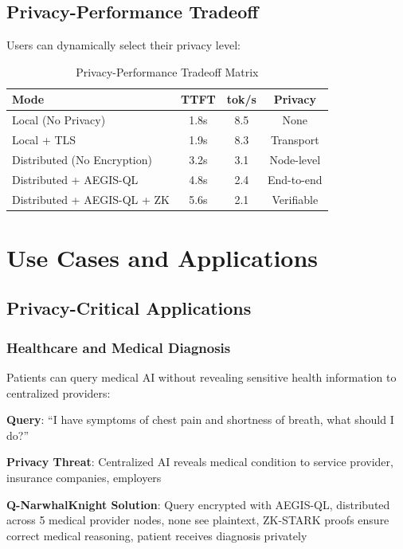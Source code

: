 \documentclass[11pt,a4paper]{article}
\begin{document}
\subsection{Privacy-Performance Tradeoff}

Users can dynamically select their privacy level:

\begin{table}[H]
\centering
\caption{Privacy-Performance Tradeoff Matrix}
\begin{tabular}{|l|c|c|c|}
\hline
\textbf{Mode} & \textbf{TTFT} & \textbf{tok/s} & \textbf{Privacy} \\
\hline
Local (No Privacy) & 1.8s & 8.5 & None \\
Local + TLS & 1.9s & 8.3 & Transport \\
Distributed (No Encryption) & 3.2s & 3.1 & Node-level \\
Distributed + AEGIS-QL & 4.8s & 2.4 & End-to-end \\
Distributed + AEGIS-QL + ZK & 5.6s & 2.1 & Verifiable \\
\hline
\end{tabular}
\end{table}

\newpage
\section{Use Cases and Applications}

\subsection{Privacy-Critical Applications}

\subsubsection{Healthcare and Medical Diagnosis}

Patients can query medical AI without revealing sensitive health information to centralized providers:

\begin{tcolorbox}[colback=privacygreen!10,colframe=privacygreen,title=\textbf{Example: Private Medical Query}]
\textbf{Query}: ``I have symptoms of chest pain and shortness of breath, what should I do?''

\textbf{Privacy Threat}: Centralized AI reveals medical condition to service provider, insurance companies, employers

\textbf{Q-NarwhalKnight Solution}: Query encrypted with AEGIS-QL, distributed across 5 medical provider nodes, none see plaintext, ZK-STARK proofs ensure correct medical reasoning, patient receives diagnosis privately
\end{tcolorbox}
\end{document}

